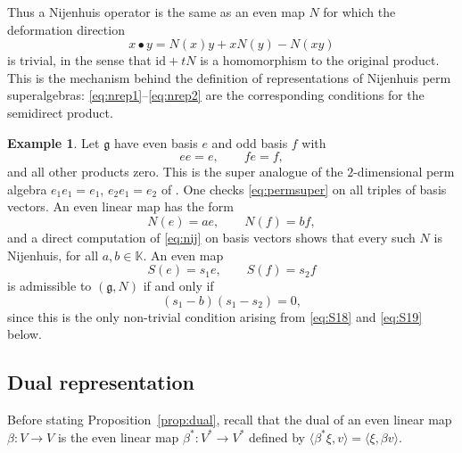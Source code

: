 \documentclass[11pt]{article}
\theoremstyle{definition}
\newtheorem{example}[theorem]{Example}
\newcommand{\g}{\mathfrak{g}}
\newcommand{\K}{\mathbb{K}}
\newcommand{\id}{\mathrm{id}}
\newcommand{\lr}[1]{\langle #1\rangle}
\begin{document}
Thus a Nijenhuis operator is the same as an even map $N$ for which the deformation direction
\[
x\bullet y=N(x)y+xN(y)-N(xy)
\]
is trivial, in the sense that $\id+tN$ is a homomorphism to the original product. This is the mechanism behind the definition of representations of Nijenhuis perm superalgebras: \eqref{eq:nrep1}--\eqref{eq:nrep2} are the corresponding conditions for the semidirect product.

\begin{example}\label{ex:11}
Let $\g$ have even basis $e$ and odd basis $f$ with
\[
ee=e,\qquad fe=f,
\]
and all other products zero. This is the super analogue of the $2$-dimensional perm algebra $e_1e_1=e_1$, $e_2e_1=e_2$ of \cite{Hou}. One checks \eqref{eq:permsuper} on all triples of basis vectors. An even linear map has the form
\[
N(e)=ae,\qquad N(f)=bf,
\]
and a direct computation of \eqref{eq:nij} on basis vectors shows that every such $N$ is Nijenhuis, for all $a,b\in\K$. An even map
\[
S(e)=s_1e,\qquad S(f)=s_2f
\]
is admissible to $(\g,N)$ if and only if
\[
(s_1-b)(s_1-s_2)=0,
\]
since this is the only non-trivial condition arising from \eqref{eq:S18} and \eqref{eq:S19} below.
\end{example}

\subsection{Dual representation}

Before stating Proposition~\ref{prop:dual}, recall that the dual of an even linear map $\beta:V\to V$ is the even linear map $\beta^*:V^*\to V^*$ defined by $\lr{\beta^*\xi,v}=\lr{\xi,\beta v}$.
\end{document}
